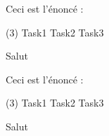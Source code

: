 \documentclass{classe-tex3R}
\begin{document}

\begin{enonce}
  Ceci est l'énoncé :

  \begin{tasks}[style=itemize](3)
    \task Task1
    \task Task2
    \task Task3
  \end{tasks}
\end{enonce}

\textcolor{rouge}{Salut}

\newpage

\begin{enonce}
  Ceci est l'énoncé :

  \begin{tasks}[style=itemize](3)
    \task Task1
    \task Task2
    \task Task3
  \end{tasks}
\end{enonce}

\textcolor{rouge}{Salut}
\end{document}
